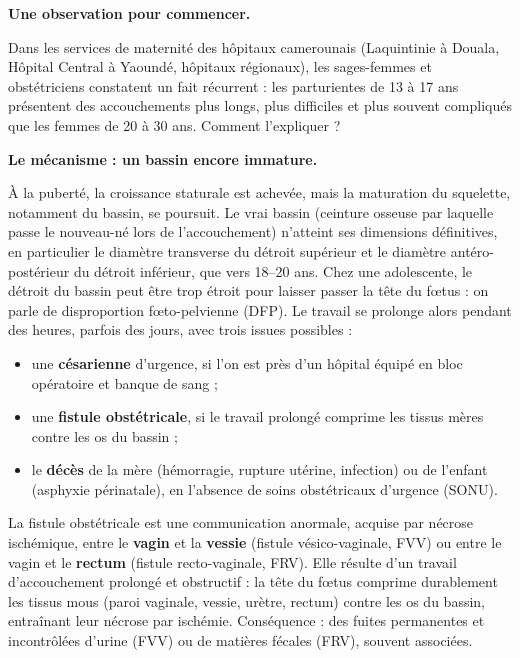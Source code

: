 \documentclass[11pt]{article}
\newcommand{\cle}[1]{{\popxbold\color{popdark}#1}}
\newcounter{popsec}
\newcounter{popsub}
\newcommand{\courssub}[1]{%
  \stepcounter{popsub}%
  \par\vspace{9pt}\noindent{\popxbold\fontsize{11.5}{13}\selectfont\color{popink}{\color{poporange}\thepopsec.\thepopsub}\hspace{6pt}#1}\par\nopagebreak\vspace{4pt}
}
\begin{document}
\courssub{Conséquences sur la santé de la mère}

\textbf{Une observation pour commencer.}\par

Dans les services de maternité des hôpitaux camerounais (Laquintinie à Douala, Hôpital Central à Yaoundé, hôpitaux régionaux), les sages-femmes et obstétriciens constatent un fait récurrent : les parturientes de 13 à 17 ans présentent des accouchements plus longs, plus difficiles et plus souvent compliqués que les femmes de 20 à 30 ans. Comment l'expliquer ?

\textbf{Le mécanisme : un bassin encore immature.}\par

À la puberté, la croissance staturale est achevée, mais la maturation du squelette, notamment du \cle{bassin}, se poursuit. Le \cle{vrai bassin} (ceinture osseuse par laquelle passe le nouveau-né lors de l'accouchement) n'atteint ses dimensions définitives, en particulier le diamètre transverse du détroit supérieur et le diamètre antéro-postérieur du détroit inférieur, que vers 18--20 ans. Chez une adolescente, le détroit du bassin peut être trop étroit pour laisser passer la tête du fœtus : on parle de \cle{disproportion fœto-pelvienne} (DFP). Le travail se prolonge alors pendant des heures, parfois des jours, avec trois issues possibles :

\begin{itemize}
\item une \textbf{césarienne} d'urgence, si l'on est près d'un hôpital équipé en bloc opératoire et banque de sang ;
\item une \textbf{fistule obstétricale}, si le travail prolongé comprime les tissus mères contre les os du bassin ;
\item le \textbf{décès} de la mère (hémorragie, rupture utérine, infection) ou de l'enfant (asphyxie périnatale), en l'absence de soins obstétricaux d'urgence (SONU).
\end{itemize}

\begin{definition}
La \cle{fistule obstétricale} est une communication anormale, acquise par nécrose ischémique, entre le \textbf{vagin} et la \textbf{vessie} (fistule vésico-vaginale, FVV) ou entre le vagin et le \textbf{rectum} (fistule recto-vaginale, FRV). Elle résulte d'un travail d'accouchement prolongé et obstructif : la tête du fœtus comprime durablement les tissus mous (paroi vaginale, vessie, urètre, rectum) contre les os du bassin, entraînant leur nécrose par ischémie. Conséquence : des fuites permanentes et incontrôlées d'urine (FVV) ou de matières fécales (FRV), souvent associées.
\end{definition}
\end{document}
